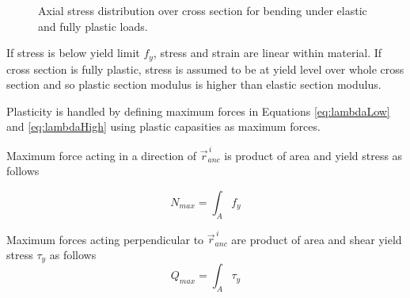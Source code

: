 \begin{figure}[htb!]
\centering
{}
\hspace{1cm}
\caption{Axial stress distribution over cross section for bending under elastic and fully plastic loads.}
\label{fig:wp}
\end{figure}

If stress is below yield limit $f_y$, stress and strain are linear within material.
If cross section is fully plastic, stress is assumed to be at yield level over whole cross section and 
so plastic section modulus is higher than elastic section modulus.

Plasticity is handled by defining maximum forces
in Equations \ref{eq:lambdaLow} and  
\ref{eq:lambdaHigh} using plastic capasities as maximum forces.

Maximum force acting in a direction of $\vec{r}_{anc}^{\,i} $
is product of area and yield stress as follows

\begin{equation} \label{eq:fN}
N_{max}= \int_A f_y
\end{equation}

Maximum forces acting perpendicular to $\vec{r}_{anc}^{\,i} $
are product of area and shear yield stress $\tau_y$ as follows
\begin{equation} \label{eq:fQ}
Q_{max}= \int_A \tau_y
\end{equation}

